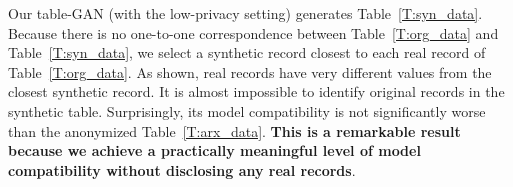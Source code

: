 Our table-GAN (with the low-privacy setting) generates Table~\ref{T:syn_data}. Because there is no one-to-one correspondence between Table~\ref{T:org_data} and Table~\ref{T:syn_data}, we select a synthetic record closest to each real record of Table~\ref{T:org_data}. As shown, real records have very different values from the closest synthetic record. It is almost impossible to identify original records in the synthetic table. Surprisingly, its model compatibility is not significantly worse than the anonymized Table~\ref{T:arx_data}. \textbf{This is a remarkable result because we achieve a practically meaningful level of model compatibility without disclosing any real records}.



